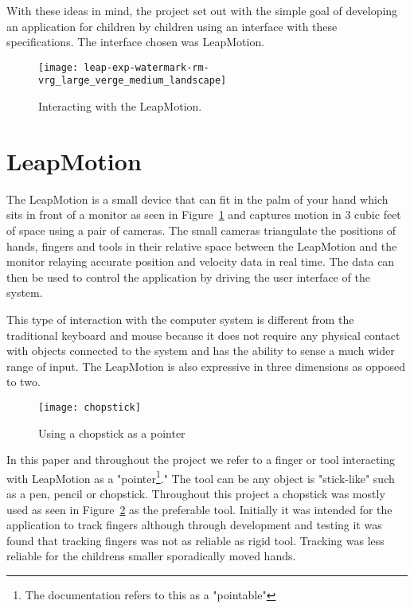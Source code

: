 With these ideas in mind, the project set out with the simple goal of developing an application for children by children using an interface with these specifications. The interface chosen was LeapMotion.


\begin{figure}
\centering
\texttt{[image: leap-exp-watermark-rm-vrg\_large\_verge\_medium\_landscape]}
\caption{Interacting with the LeapMotion. \cite{theverge} }
\label{fig:leapmotionpicture}
\end{figure}

\section{LeapMotion}

The LeapMotion is a small device that can fit in the palm of your hand which sits in front of a monitor as seen in Figure~\ref{fig:leapmotionpicture} and captures motion in 3 cubic feet of space using a pair of cameras. The small cameras triangulate the positions of hands, fingers and tools in their relative space between the LeapMotion and the monitor relaying accurate position and velocity data in real time. The data can then be used to control the application by driving the user interface of the system. \cite{leapmotion} 

This type of interaction with the computer system is different from the traditional keyboard and mouse because it does not require any physical contact with objects connected to the system and has the ability to sense a much wider range of input. The LeapMotion is also expressive in three dimensions as opposed to two.

\begin{figure}
\centering
\texttt{[image: chopstick]}
\caption{Using a chopstick as a pointer}
\label{fig:chopstick}
\end{figure}
In this paper and throughout the project we refer to a finger or tool interacting with LeapMotion as a "pointer\footnote{The documentation refers to this as a "pointable"}." The tool can be any object is "stick-like" such as a pen, pencil or chopstick. Throughout this project a chopstick was mostly used as seen in Figure~\ref{fig:chopstick} as the preferable tool. Initially it was intended for the application to track fingers although through development and testing it was found that tracking fingers was not as reliable as rigid tool. Tracking was less reliable for the childrens smaller sporadically moved hands.

